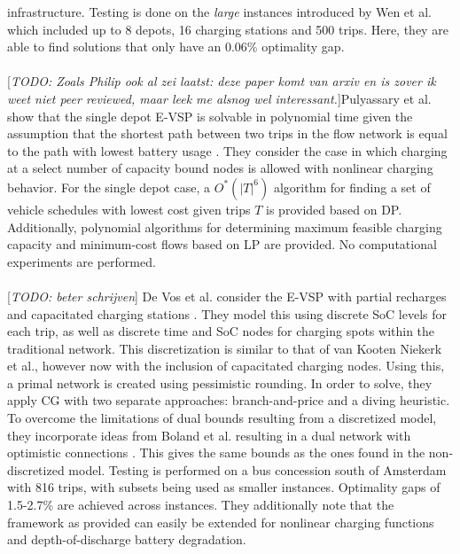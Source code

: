 \documentclass[]{article}
\newcommand{\todo}[1]{{\color{red}[\textit{TODO: #1}]}}
\begin{document}
infrastructure. Testing is done on the \textit{large}
instances introduced by Wen et al. \citet{Wen2016} which included up to 8
depots, 16 charging stations and 500 trips. Here, they are able to find
solutions that only have an 0.06\% optimality gap. \\\\
\todo{Zoals Philip ook al zei laatst: deze paper komt van arxiv en is zover ik weet niet peer reviewed, maar leek me alsnog wel interessant.}Pulyassary et al. show that the single depot E-VSP is solvable in polynomial time given the
assumption that the shortest path between two trips in the flow network is
equal to the path with lowest battery usage \citet{Pulyassary2024}. They
consider the case in which charging at a select number of capacity bound nodes
is allowed with nonlinear charging behavior. For the single depot case, a
$O^*(|T|^6)$ algorithm for finding a set of vehicle schedules with lowest cost
given trips $T$ is provided based on DP. Additionally, polynomial algorithms
for determining maximum feasible charging capacity and minimum-cost flows based
on LP are provided. No computational experiments are performed. \\\\

\todo{beter schrijven}
De Vos et al. consider the E-VSP with partial recharges and capacitated charging stations \citet{deVos2024}. 
They model this using discrete SoC levels for each trip, as well as discrete time and SoC nodes for charging spots within the traditional network. This discretization is similar to that of van Kooten Niekerk et al., however now with the inclusion of capacitated charging nodes. Using this, a primal network is created using pessimistic
rounding. In order to solve, they apply CG with two separate approaches:
branch-and-price and a diving heuristic. To overcome the limitations of dual
bounds resulting from a discretized model, they incorporate ideas from Boland
et al. resulting in a dual network with optimistic connections
\citet{Boland2017}. This gives the same bounds as the ones found in the
non-discretized model. Testing is performed on a bus concession south of
Amsterdam with 816 trips, with subsets being used as smaller instances.
Optimality gaps of 1.5-2.7\% are achieved across instances. They additionally
note that the framework as provided can easily be extended for nonlinear
charging functions and depth-of-discharge battery degradation. \\\\
\end{document}
